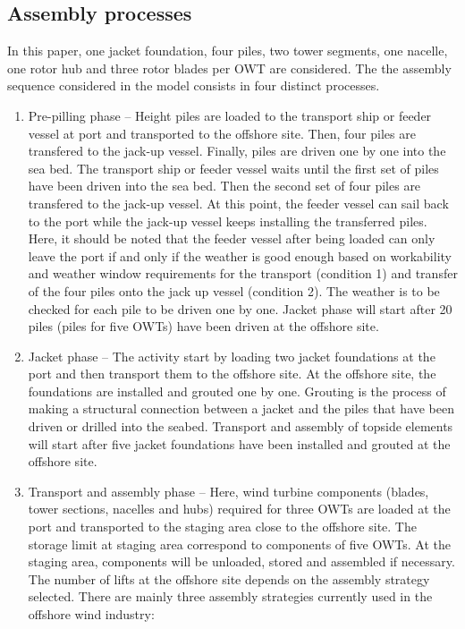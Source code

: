 \subsection{Assembly processes}
In this paper, one jacket foundation, four piles, two tower segments, one nacelle, one rotor hub and three rotor blades per OWT are considered. The the assembly sequence considered in the model consists in four distinct processes.
\begin{enumerate}
\item Pre-pilling phase -- Height piles are loaded to the transport ship or feeder vessel at port and transported to the offshore site. Then, four piles are transfered to the jack-up vessel. Finally, piles are driven one by one into the sea bed. The transport ship or feeder vessel waits until the first set of piles have been driven into the sea bed. Then the second set of four piles are transfered to the jack-up vessel. At this point, the feeder vessel can sail back to the port while the jack-up vessel keeps installing the transferred piles. Here, it should be noted that the feeder vessel after being loaded can only leave the port if and only if the weather is good enough based on workability and weather window requirements for the transport (condition 1) and transfer of the four piles onto the jack up vessel (condition 2). The weather is to be checked for each pile to be driven one by one. Jacket phase will start after 20 piles (piles for five OWTs) have been driven at the offshore site. 

\item Jacket phase -- The activity start by loading two jacket foundations at the port and then transport them to the offshore site. At the offshore site, the foundations are installed and grouted one by one. Grouting is the process of making a structural connection between a jacket and the piles that have been driven or drilled into the seabed. Transport and assembly of topside elements will start after five jacket foundations have been installed and grouted at the offshore site.  

\item Transport and assembly phase -- Here, wind turbine components (blades, tower sections, nacelles and hubs) required for three OWTs are loaded at the port and transported to the staging area close to the offshore site. The storage limit at staging area correspond to components of five OWTs. At the staging area, components will be unloaded, stored and assembled if necessary. The number of lifts at the offshore site depends on the assembly strategy selected. There are mainly three assembly strategies currently used in the offshore wind industry:


\end{enumerate}
